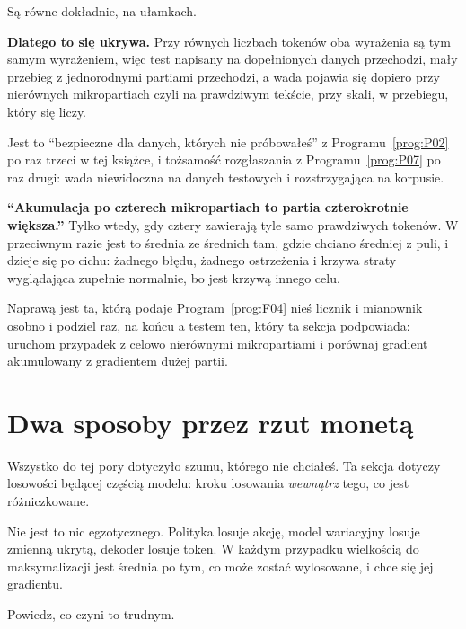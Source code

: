 \begin{fr}
\begin{ansblock}
Są równe \dash{} dokładnie, na ułamkach.
\end{ansblock}

\textbf{Dlatego to się ukrywa.} Przy równych liczbach tokenów oba wyrażenia są
tym samym wyrażeniem, więc test napisany na dopełnionych danych przechodzi,
mały przebieg z jednorodnymi partiami przechodzi, a wada pojawia się dopiero
przy nierównych mikropartiach \dash{} czyli na prawdziwym tekście, przy skali,
w przebiegu, który się liczy.

Jest to \enquote{bezpieczne dla danych, których nie próbowałeś} z
Programu~\ref{prog:P02} po raz trzeci w tej książce, i tożsamość rozgłaszania z
Programu~\ref{prog:P07} po raz drugi: wada niewidoczna na danych testowych i
rozstrzygająca na korpusie.
\end{fr}

\begin{fr}
\begin{trapbox}
\textbf{\enquote{Akumulacja po czterech mikropartiach to partia czterokrotnie
większa.}} Tylko wtedy, gdy cztery zawierają tyle samo prawdziwych tokenów. W
przeciwnym razie jest to średnia ze średnich tam, gdzie chciano średniej z
puli, i dzieje się po cichu: żadnego błędu, żadnego ostrzeżenia i krzywa straty
wyglądająca zupełnie normalnie, bo jest krzywą innego celu.

Naprawą jest ta, którą podaje Program~\ref{prog:F04} \dash{} nieś licznik i
mianownik osobno i podziel raz, na końcu \dash{} a testem ten, który ta sekcja
podpowiada: uruchom przypadek z celowo nierównymi mikropartiami i porównaj
gradient akumulowany z gradientem dużej partii.
\end{trapbox}
\end{fr}

\section{Dwa sposoby przez rzut monetą}
\label{sec:P21-estimators}

\begin{fr}
Wszystko do tej pory dotyczyło szumu, którego nie chciałeś. Ta sekcja dotyczy
losowości będącej częścią modelu: kroku losowania \emph{wewnątrz} tego, co jest
różniczkowane.

Nie jest to nic egzotycznego. Polityka losuje akcję, model wariacyjny losuje
zmienną ukrytą, dekoder losuje token. W każdym przypadku wielkością do
maksymalizacji jest średnia po tym, co może zostać wylosowane, i chce się jej
gradientu.

Powiedz, co czyni to trudnym.
\dotline
\nextframe
\end{fr}

